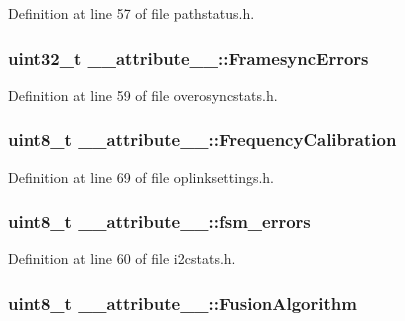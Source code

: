 \-Definition at line 57 of file pathstatus.\-h.

\hypertarget{struct____attribute_____ab9d44907fdbaf9aa9441ed7e8706078b}{
\subsubsection[{\-Framesync\-Errors}]{\setlength{\rightskip}{0pt plus 5cm}uint32\-\_\-t {\bf \-\_\-\-\_\-attribute\-\_\-\-\_\-\-::\-Framesync\-Errors}}}\label{struct____attribute_____ab9d44907fdbaf9aa9441ed7e8706078b}


\-Definition at line 59 of file overosyncstats.\-h.

\hypertarget{struct____attribute_____a6d623f9f5d5c6938ef4cf34c53ca6215}{
\subsubsection[{\-Frequency\-Calibration}]{\setlength{\rightskip}{0pt plus 5cm}uint8\-\_\-t {\bf \-\_\-\-\_\-attribute\-\_\-\-\_\-\-::\-Frequency\-Calibration}}}\label{struct____attribute_____a6d623f9f5d5c6938ef4cf34c53ca6215}


\-Definition at line 69 of file oplinksettings.\-h.

\hypertarget{struct____attribute_____a3e28c40cf08f379fab9e5fead85aef68}{
\subsubsection[{fsm\-\_\-errors}]{\setlength{\rightskip}{0pt plus 5cm}uint8\-\_\-t {\bf \-\_\-\-\_\-attribute\-\_\-\-\_\-\-::fsm\-\_\-errors}}}\label{struct____attribute_____a3e28c40cf08f379fab9e5fead85aef68}


\-Definition at line 60 of file i2cstats.\-h.

\hypertarget{struct____attribute_____a9df38e042d07da534ef56c6d0853b311}{
\subsubsection[{\-Fusion\-Algorithm}]{\setlength{\rightskip}{0pt plus 5cm}uint8\-\_\-t {\bf \-\_\-\-\_\-attribute\-\_\-\-\_\-\-::\-Fusion\-Algorithm}}}\label{struct____attribute_____a9df38e042d07da534ef56c6d0853b311}


